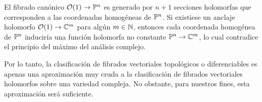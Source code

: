 \begin{example}
El fibrado canónico $\O(1) \to \P^n$ es generado por $n+1$ secciones holomorfas que corresponden a las coordenadas homogéneas de $\P^n$. Si existiese un anclaje holomorfo $\O(1) \to \C^m$ para algún $m \in \N$, entonces cada coordenada homogénea de $\P^n$ induciría una función holomorfa no constante $\P^n \to \C^m$, lo cual contradice el principio del máximo del análisis complejo.
\end{example}

Por lo tanto, la clasificación de fibrados vectoriales topológicos o diferenciables es apenas una aproximación muy cruda a la clasificación de fibrados vectoriales holomorfos sobre una variedad compleja. No obstante, para nuestros fines, esta aproximación será suficiente.
